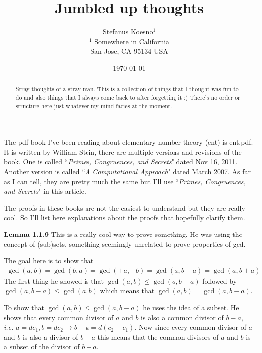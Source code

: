 \documentclass[aps,preprint,preprintnumbers,nofootinbib,showpacs,prd]{revtex4-1}
\newcommand{\ie}{{\it i.e.} }
\newcommand{\nbea}{\begin{eqnarray*}}
\newcommand{\neea}{\end{eqnarray*}}
\begin{document}
\title{Jumbled up thoughts}
\bigskip
\author{Stefanus Koesno$^1$\\
$^1$ Somewhere in California\\ San Jose, CA 95134 USA\\
}
%
\date{\today}
%
\begin{abstract}
Stray thoughts of a stray man. This is a collection of things that I thought was fun to do and also things that I always come back to after forgetting it :) There's no order or structure here just whatever my mind facies at the moment.

\end{abstract}
%
\maketitle

\renewcommand{\theequation}{A.\arabic{equation}}  %
\setcounter{equation}{0}  %

The pdf book I've been reading about elementary number theory (ent) is ent.pdf. It is written by William Stein, there are multiple versions and revisions of the book. One is called ``{\it Primes, Congruences, and Secrets}" dated Nov 16, 2011. Another version is called ``{\it A Computational Approach}" dated March 2007. As far as I can tell, they are pretty much the same but I'll use ``{\it Primes, Congruences, and Secrets}" in this article.

The proofs in these books are not the easiest to understand but they are really cool. So I'll list here explanations about the proofs that hopefully clarify them.

{\bf Lemma 1.1.9} This is a really cool way to prove something. He was using the concept of (sub)sets, something seemingly unrelated to prove properties of gcd.

The goal here is to show that 
%
\nbea
\gcd(a,b) = \gcd(b,a) = \gcd(\pm a,\pm b) = \gcd(a,b-a) = \gcd(a,b+a)
\neea
%
The first thing he showed is that $\gcd(a,b) \le \gcd(a,b-a)$ followed by $\gcd(a,b-a) \le \gcd(a,b)$ which means that $\gcd(a,b) = \gcd(a,b-a)$.

To show that $\gcd(a,b) \le \gcd(a,b-a)$ he uses the idea of a subset. He shows that every common divisor of $a$ and $b$ is also a common divisor of $b-a$, \ie $a = d c_1, b=d c_2 \to b-a = d(c_2-c_1)$. Now since every common divisor of $a$ and $b$ is also a divisor of $b-a$ this means that the common divisors of $a$ and $b$ is a subset of the divisor of $b-a$.
\end{document}
